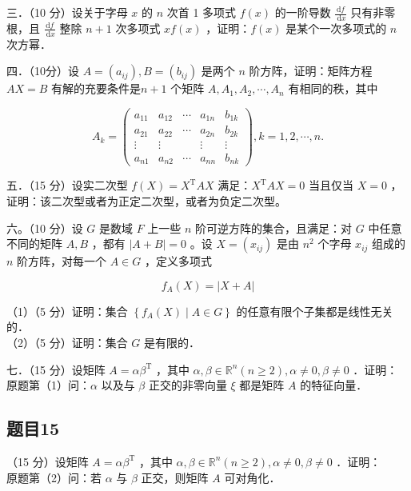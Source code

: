 \documentclass{article}
\begin{document}
三．（10 分）设关于字母 \(x\) 的 \(n\) 次首 1 多项式 \(f(x)\) 的一阶导数 \(\frac{\mathrm{d} f}{\mathrm{~d} x}\) 只有非零根，且 \(\frac{\mathrm{d} f}{\mathrm{~d} x}\) 整除 \(n+1\) 次多项式 \(x f(x)\) ，证明：\(f(x)\) 是某个一次多项式的 \(n\) 次方幂．

四．（10分）设 \(A=\left(a_{i j}\right), B=\left(b_{i j}\right)\) 是两个 \(n\) 阶方阵，证明：矩阵方程 \(A X=B\) 有解的充要条件是\(n+1\) 个矩阵 \(A, A_{1}, A_{2}, \cdots, A_{n}\) 有相同的秩，其中

\[
A_{k}=\left(\begin{array}{ccccc}
a_{11} & a_{12} & \cdots & a_{1 n} & b_{1 k} \\
a_{21} & a_{22} & \cdots & a_{2 n} & b_{2 k} \\
\vdots & \vdots & & \vdots & \vdots \\
a_{n 1} & a_{n 2} & \cdots & a_{n n} & b_{n k}
\end{array}\right), k=1,2, \cdots, n .
\]

五．（15 分）设实二次型 \(f(X)=X^{\mathrm{T}} A X\) 满足：\(X^{\mathrm{T}} A X=0\) 当且仅当 \(X=0\) ，证明：该二次型或者为正定二次型，或者为负定二次型。

六。（10 分）设 \(G\) 是数域 \(F\) 上一些 \(n\) 阶可逆方阵的集合，且满足：对 \(G\) 中任意不同的矩阵 \(A, B\) ，都有 \(|A+B|=0\) 。设 \(X=\left(x_{i j}\right)\) 是由 \(n^{2}\) 个字母 \(x_{i j}\) 组成的 \(n\) 阶方阵，对每一个 \(A \in G\) ，定义多项式

\[
f_{A}(X)=|X+A|
\]

（1）（5 分）证明：集合 \(\left\{f_{A}(X) \mid A \in G\right\}\) 的任意有限个子集都是线性无关的．\\
（2）（5 分）证明：集合 \(G\) 是有限的．

七．（15 分）设矩阵 \(A=\alpha \beta^{\mathrm{T}}\) ，其中 \(\alpha, \beta \in \mathbb{R}^{n}(n \geq 2), \alpha \neq 0, \beta \neq 0\) ．证明：\\
原题第（1）问：\(\alpha\) 以及与 \(\beta\) 正交的非零向量 \(\xi\) 都是矩阵 \(A\) 的特征向量．\\

\subsection{题目15}
（15 分）设矩阵 \(A=\alpha \beta^{\mathrm{T}}\) ，其中 \(\alpha, \beta \in \mathbb{R}^{n}(n \geq 2), \alpha \neq 0, \beta \neq 0\) ．证明：\\
原题第（2）问：若 \(\alpha\) 与 \(\beta\) 正交，则矩阵 \(A\) 可对角化．\\
\end{document}
